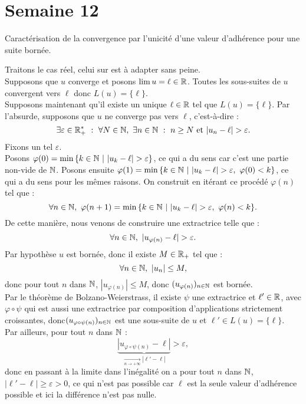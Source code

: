 \documentclass{article}
\begin{document}
\pagebreak\section{Semaine 12}
	
	\begin{question_kholle}
		{Caractérisation de la convergence par l'unicité d'une valeur d'adhérence pour une suite bornée.}

		Traitons le cas réel, celui sur \C est à adapter sans peine.\\
		Supposons que $u$ converge et posons $\lim u =\ell \in \mathbb R  $. Toutes les sous-suites de $u$ convergent vers $\ell$ donc $L(u)=\{\ell \}$. \\
		Supposons maintenant qu'il existe un unique $\ell \in \mathbb R$ tel que $L(u) = \{ \ell \}$. Par l'absurde, supposons que $u$ ne converge pas vers $\ell$, c'est-à-dire : 
		\[
			\exists \varepsilon \in \mathbb R ^* _+ \ : \ \forall N \in \mathbb N, \ \exists n \in \mathbb N \ : \ n\geq N \text{ et } |u_n - \ell | > \varepsilon.
		\]
		Fixons un tel $\varepsilon$. \\
		Posons $\varphi (0) = \min{ \{ k\in \N \ | \ |u_k - \ell| > \varepsilon \} }$, ce qui a du sens car c'est une partie non-vide de $\mathbb N$. Posons ensuite $\varphi (1) = \min{ \{ k\in \N \ | \ |u_k - \ell| > \varepsilon, \ \varphi(0) < k \} } $, ce qui a du sens pour les mêmes raisons. On construit en itérant ce procédé $\varphi (n)$ tel que : 
		\[
			\forall n \in \mathbb N, \ \varphi(n+1) = \min{ \{ k\in \ensuremath{\mathbb N} \ | \ |u_k - \ell| > \varepsilon, \ \varphi(n) < k \} }.
		\]
		De cette manière, nous venons de construire une extractrice telle que : 
		\[
			\forall n \in \N, \ |u_{\varphi(n)} - \ell| > \varepsilon.
		\]
		Par hypothèse $u$ est bornée, donc il existe $M\in \mathbb R _+$ tel que : 
		\[
			\forall n \in \mathbb N, \ |u_n| \leq M,
		\]
		donc pour tout $n$ dans $\mathbb N$, $|u_{\varphi(n)}| \leq M$, donc $(u_{\varphi(n)})_{n\in \mathbb N}$ est bornée. \\
		Par le théorème de Bolzano-Weierstrass, il existe $\psi$ une extractrice et $\ell ' \in \mathbb R$, avec $\varphi \circ \psi$ qui est aussi une extractrice par composition d'applications strictement croissantes, donc$(u_{\varphi \circ \psi (n)})_{n\in \mathbb N}$ est une sous-suite de $u$ et $\ell ' \in L(u) = \{ \ell \}$.\\
		Par ailleurs, pour tout $n$ dans $\mathbb N$ :
		\[
			\underset{\xrightarrow[n\to +\infty]{}|\ell' -\ell|}{\underbrace{|u_{\varphi \circ \psi (n)} - \ell|}} > \varepsilon,
		\]
		donc en passant à la limite dans l'inégalité on a pour tout $n$ dans $\mathbb N$, $|\ell ' - \ell | \geq \varepsilon > 0$, ce qui n'est pas possible car $\ell$ est la seule valeur d'adhérence possible et ici la différence n'est pas nulle.
	\end{question_kholle}
\end{document}
